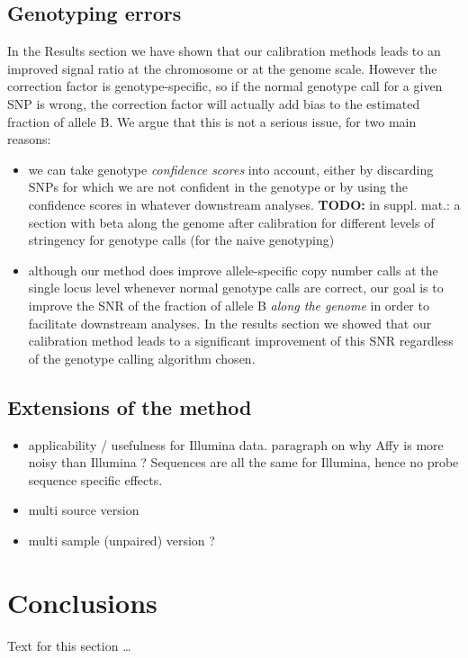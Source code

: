 \documentclass[10pt]{bmc_article}
\newenvironment{bmcformat}{\fussy\setboolean{publ}{true}}{\fussy}
\newenvironment{TODO}{\color{red}\textbf{TODO:}}{}
\begin{document}
\begin{bmcformat}
\subsection*{Genotyping errors}
In the Results section we have shown that our calibration methods leads to an improved signal ratio at the chromosome or at the genome scale. However the correction factor is genotype-specific, so if the normal genotype call for a given SNP is wrong, the correction factor will actually add bias to the estimated fraction of allele B. We argue that this is not a serious issue, for two main reasons:
\begin{itemize}
\item we can take genotype \emph{confidence scores} into account, either by discarding SNPs for which we are not confident in the genotype or by  using the confidence scores in whatever downstream analyses. 
\begin{TODO}
  in suppl. mat.: a section with beta along the genome after calibration for different levels of stringency for genotype calls (for the naive genotyping)
\end{TODO}
\item although our method does improve allele-specific copy number calls at the single locus level whenever normal genotype calls are correct, our goal is to improve the SNR of the fraction of allele B \emph{along the genome} in order to facilitate downstream analyses. In the results section we showed that our calibration method leads to a significant improvement of this SNR regardless of the genotype calling algorithm chosen. 
\end{itemize}

\subsection*{Extensions of the method}
\begin{itemize}
\item applicability / usefulness for Illumina data. paragraph on why Affy is more noisy than Illumina ? Sequences are all the same for Illumina, hence no probe sequence specific effects.
\item multi source version
\item multi sample (unpaired) version ?
\end{itemize}

    

\section*{Conclusions}
  Text for this section \ldots



\end{bmcformat}
\end{document}
